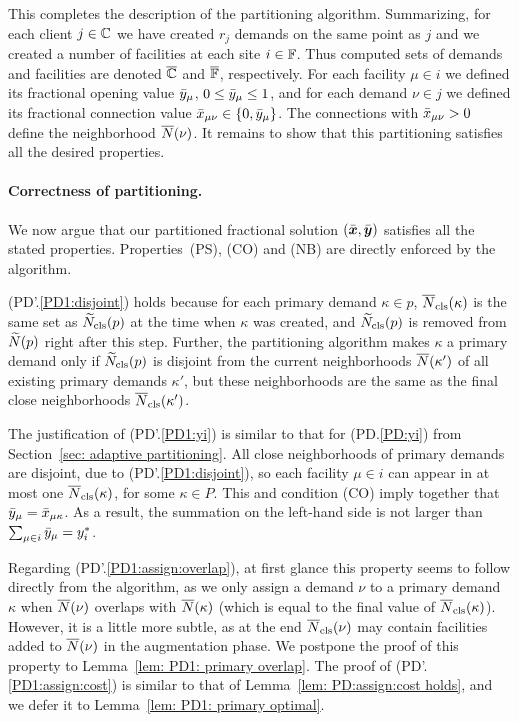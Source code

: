 This completes the description of the partitioning algorithm. Summarizing, for 
each client $j\in\mathbb{C}$ we have created $r_j$ demands on the same point as $j$ and
we created a number of facilities at each site $i\in\mathbb{F}$. Thus computed
sets of demands and facilities are denoted $\overline{\mathbb{C}}$ and $\overline{\mathbb{F}}$,
respectively.
For each facility $\mu\in i$ we defined its fractional opening value ${\bar y}_\mu$, $0\le {\bar y}_\mu\le 1$,
and for each demand $\nu\in j$ we defined its fractional connection value ${\bar x}_{\mu\nu}\in { \left\{ 0,{\bar y}_\mu \right\} }$.
The connections with ${\bar x}_{\mu\nu} > 0$ define the neighborhood ${\overline{N}}(\nu)$. 
It remains to show that this partitioning
satisfies all the desired properties.


\medskip
\paragraph{Correctness of partitioning.}
We now argue that our partitioned fractional solution $(\bar{\boldsymbol{x}},\bar{\boldsymbol{y}})$
satisfies all the stated properties. Properties~(PS), (CO) and (NB) are
directly enforced by the algorithm.

(PD'.\ref{PD1:disjoint}) holds because for each primary demand $\kappa\in p$, 
${\overline{N}}_{\text{cls}}(\kappa)$ is the same set as ${\widetilde N}_{\text{cls}}(p)$ at the time when
$\kappa$ was created, and ${\widetilde N}_{\text{cls}}(p)$ is removed from ${\widetilde N}(p)$
right after this step. Further, the partitioning algorithm makes $\kappa$ a primary demand
only if ${\widetilde N}_{\text{cls}}(p)$ is disjoint from the current neighborhoods
${\overline{N}}(\kappa')$ of all existing primary demands $\kappa'$, but these neighborhoods
are the same as the final close neighborhoods ${\overline{N}}_{\text{cls}}(\kappa')$.

The justification of (PD'.\ref{PD1:yi}) is similar to that for (PD.\ref{PD:yi}) from
Section~\ref{sec: adaptive partitioning}. All close neighborhoods of
primary demands are disjoint, due to (PD'.\ref{PD1:disjoint}), so
each facility $\mu \in i$ can appear in at most one
${\overline{N}}_{\text{cls}}(\kappa)$, for some $\kappa\in P$. This and condition (CO) imply together
that ${\bar y}_{\mu} = {\bar x}_{\mu\kappa}$. As a result, the
summation on the left-hand side is not larger than 
$\sum_{\mu\in i}{\bar y}_{\mu} = y_i^\ast$. 

Regarding (PD'.\ref{PD1:assign:overlap}), at first glance this
property seems to follow directly from the algorithm, as we only assign a
demand $\nu$ to a primary demand $\kappa$ when ${\overline{N}}(\nu)$ overlaps
with ${\overline{N}}(\kappa)$ (which is equal to the final value of ${\overline{N}}_{\text{cls}}(\kappa)$).
 However, it is a little more subtle, as at the end
${\overline{N}}_{\text{cls}}(\nu)$ may contain facilities added to ${\overline{N}}(\nu)$ in
the augmentation phase. We postpone
the proof of this property to Lemma~\ref{lem: PD1: primary overlap}.
The proof of (PD'.\ref{PD1:assign:cost}) is similar to that of
Lemma~\ref{lem: PD:assign:cost holds}, and we defer it to
Lemma~\ref{lem: PD1: primary optimal}. 


